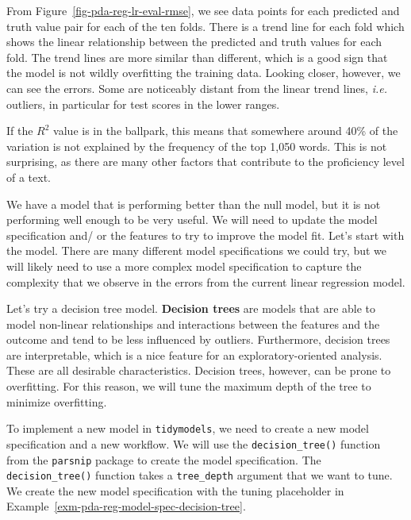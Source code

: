 \documentclass[
  letterpaper,
]{latex/krantz}
\theoremstyle{definition}
\theoremstyle{remark}
\begin{document}
From Figure~\ref{fig-pda-reg-lr-eval-rmse}, we see data points for each
predicted and truth value pair for each of the ten folds. There is a
trend line for each fold which shows the linear relationship between the
predicted and truth values for each fold. The trend lines are more
similar than different, which is a good sign that the model is not
wildly overfitting the training data. Looking closer, however, we can
see the errors. Some are noticeably distant from the linear trend lines,
\emph{i.e.} outliers, in particular for test scores in the lower ranges.

If the \(R^2\) value is in the ballpark, this means that somewhere
around 40\% of the variation is not explained by the frequency of the
top 1,050 words. This is not surprising, as there are many other factors
that contribute to the proficiency level of a text.

We have a model that is performing better than the null model, but it is
not performing well enough to be very useful. We will need to update the
model specification and/ or the features to try to improve the model
fit. Let's start with the model. There are many different model
specifications we could try, but we will likely need to use a more
complex model specification to capture the complexity that we observe in
the errors from the current linear regression model.

Let's try a decision tree model. \textbf{Decision trees} are models that
are able to model non-linear relationships and interactions between the
features and the outcome and tend to be less influenced by outliers.
Furthermore, decision trees are interpretable, which is a nice feature
for an exploratory-oriented analysis. These are all desirable
characteristics. Decision trees, however, can be prone to overfitting.
For this reason, we will tune the maximum depth of the tree to minimize
overfitting.

To implement a new model in \texttt{tidymodels}, we need to create a new
model specification and a new workflow. We will use the
\texttt{decision\_tree()} function from the \texttt{parsnip} package to
create the model specification. The \texttt{decision\_tree()} function
takes a \texttt{tree\_depth} argument that we want to tune. We create
the new model specification with the tuning placeholder in
Example~\ref{exm-pda-reg-model-spec-decision-tree}.
\end{document}
